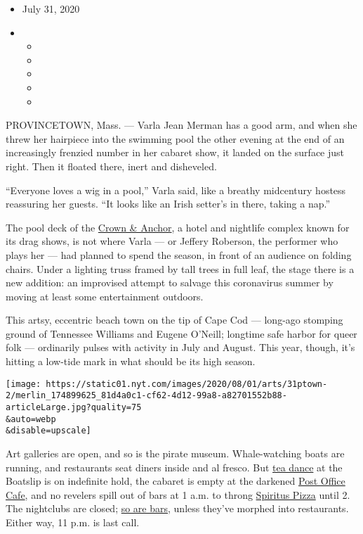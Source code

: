 \begin{itemize}
\item
  July 31, 2020
\item
  \begin{itemize}
  \item
  \item
  \item
  \item
  \item
  \end{itemize}
\end{itemize}

PROVINCETOWN, Mass. --- Varla Jean Merman has a good arm, and when she
threw her hairpiece into the swimming pool the other evening at the end
of an increasingly frenzied number in her cabaret show, it landed on the
surface just right. Then it floated there, inert and disheveled.

``Everyone loves a wig in a pool,'' Varla said, like a breathy
midcentury hostess reassuring her guests. ``It looks like an Irish
setter's in there, taking a nap.''

The pool deck of the
\href{https://onlyatthecrown.com/entertainment}{Crown \& Anchor}, a
hotel and nightlife complex known for its drag shows, is not where Varla
--- or Jeffery Roberson, the performer who plays her --- had planned to
spend the season, in front of an audience on folding chairs. Under a
lighting truss framed by tall trees in full leaf, the stage there is a
new addition: an improvised attempt to salvage this coronavirus summer
by moving at least some entertainment outdoors.

This artsy, eccentric beach town on the tip of Cape Cod --- long-ago
stomping ground of Tennessee Williams and Eugene O'Neill; longtime safe
harbor for queer folk --- ordinarily pulses with activity in July and
August. This year, though, it's hitting a low-tide mark in what should
be its high season.

\texttt{[image: https://static01.nyt.com/images/2020/08/01/arts/31ptown-2/merlin\_174899625\_81d4a0c1-cf62-4d12-99a8-a82701552b88-articleLarge.jpg?quality=75\\\&auto=webp\\\&disable=upscale]}

Art galleries are open, and so is the pirate museum. Whale-watching
boats are running, and restaurants seat diners inside and al fresco. But
\href{https://theboatslip.com/tea-dance}{tea dance} at the Boatslip is
on indefinite hold, the cabaret is empty at the darkened
\href{https://www.postofficecabaret.com}{Post Office Cafe}, and no
revelers spill out of bars at 1 a.m. to throng
\href{http://spirituspizza.com}{Spiritus Pizza} until 2. The nightclubs
are closed;
\href{https://provincetownindependent.org/featured/2020/07/09/last-call-at-11-p-m-in-provincetown/}{so
are bars}, unless they've morphed into restaurants. Either way, 11 p.m.
is last call.

